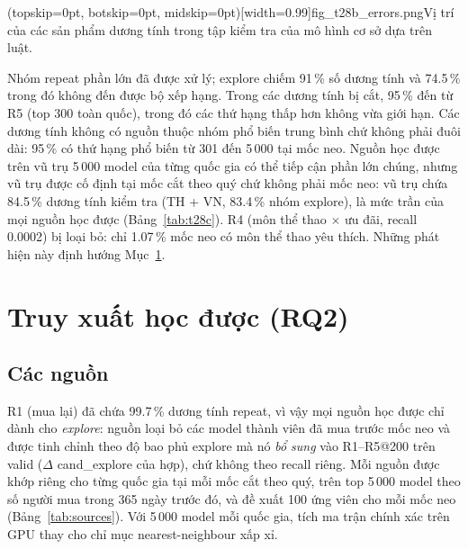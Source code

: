 \documentclass[jtehm]{ieeeaccess}
\begin{document}
\Figure[t!](topskip=0pt, botskip=0pt, midskip=0pt)[width=0.99\columnwidth]{fig_t28b_errors.png}{Vị trí của các sản phẩm dương tính trong tập kiểm tra của mô hình cơ sở dựa trên luật.\label{fig:t28b}}

Nhóm repeat phần lớn đã được xử lý; explore chiếm 91\,\% số dương tính và 74.5\,\% trong đó không đến được bộ xếp hạng. Trong các dương tính bị cắt, 95\,\% đến từ R5 (top 300 toàn quốc), trong đó các thứ hạng thấp hơn không vừa giới hạn. Các dương tính không có nguồn thuộc nhóm phổ biến trung bình chứ không phải đuôi dài: 95\,\% có thứ hạng phổ biến từ 301 đến 5\,000 tại mốc neo. Nguồn học được trên vũ trụ 5\,000 model của từng quốc gia có thể tiếp cận phần lớn chúng, nhưng vũ trụ được cố định tại mốc cắt theo quý chứ không phải mốc neo: vũ trụ chứa 84.5\,\% dương tính kiểm tra (TH + VN, 83.4\,\% nhóm explore), là mức trần của mọi nguồn học được (Bảng~\ref{tab:t28c}). R4 (môn thể thao $\times$ ưu đãi, recall 0.0002) bị loại bỏ: chỉ 1.07\,\% mốc neo có môn thể thao yêu thích. Những phát hiện này định hướng Mục~\ref{sec:retrieval}.

\section{Truy xuất học được (RQ2)}
\label{sec:retrieval}

\subsection{Các nguồn}
R1 (mua lại) đã chứa 99.7\,\% dương tính repeat, vì vậy mọi nguồn học được chỉ dành cho \emph{explore}: nguồn loại bỏ các model thành viên đã mua trước mốc neo và được tinh chỉnh theo độ bao phủ explore mà nó \emph{bổ sung} vào R1--R5@200 trên valid ($\Delta$ cand\_explore của hợp), chứ không theo recall riêng. Mỗi nguồn được khớp riêng cho từng quốc gia tại mỗi mốc cắt theo quý, trên top 5\,000 model theo số người mua trong 365 ngày trước đó, và đề xuất 100 ứng viên cho mỗi mốc neo (Bảng~\ref{tab:sources}). Với 5\,000 model mỗi quốc gia, tích ma trận chính xác trên GPU thay cho chỉ mục nearest-neighbour xấp xỉ.
\end{document}
